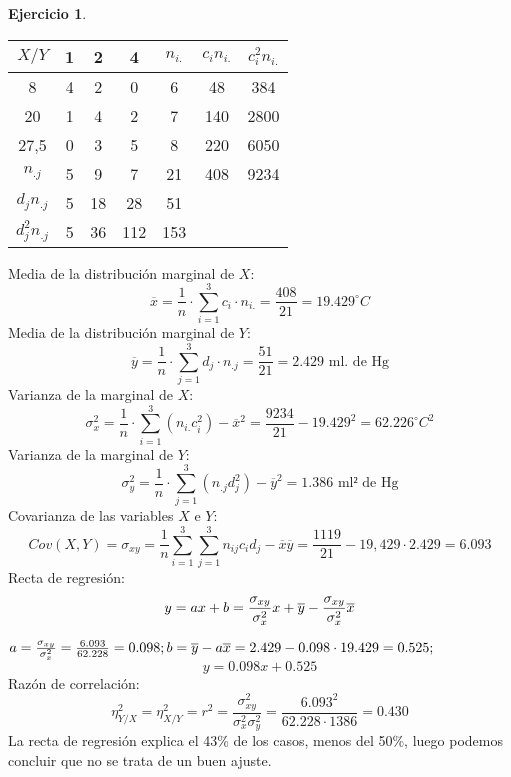 \documentclass[a4paper, 12pt]{article}
\theoremstyle{definition}
\newtheorem{ej}{Ejercicio}
\begin{document}
\begin{ej}
\begin{center}
\begin{tabular}{c|ccc|ccc}
    $X/Y$ & 1 & 2 & 4 & $n_{i.}$ & $c_i n_{i.}$ & $c_i^2 n_{i.}$ \\
    \hline
    8 & 4 & 2 & 0 & 6 & 48 & 384 \\
    20 & 1 & 4 & 2 & 7 & 140 & 2800 \\
    27,5 & 0 & 3 & 5 & 8 & 220 & 6050 \\
    \hline
    $n_{.j}$ & 5 & 9 & 7 & 21 & 408 & 9234 \\
    $d_{j}n_{.j}$ & 5 & 18 & 28 & 51 \\
    $d_{j}^2 n_{.j}$ & 5 & 36 & 112 & 153 \\
\end{tabular}
\end{center} 

Media de la distribución marginal de $X$:
\[
\overline{x} = \frac{1}{n}\cdot \sum_{i=1}^3 c_i\cdot n_{i.} = \frac{408}{21} = 19.429^{\circ}C
\]
Media de la distribución marginal de $Y$:
\[
\overline{y} = \frac{1}{n}\cdot \sum_{j=1}^3 d_j\cdot n_{.j} = \frac{51}{21} = 2.429\text{ ml. de Hg}
\]
Varianza de la marginal de $X$:
\[
\sigma_x^2 = \frac{1}{n}\cdot \sum_{i=1}^3 (n_{i.}  c_i^2) -\overline{x}^2 = \frac{9234}{21} - 19.429^2 = 62.226^{\circ} C^2
\]
Varianza de la marginal de $Y$:
\[
\sigma_y^2 = \frac{1}{n}\cdot \sum_{j=1}^3 (n_{.j}  d_j^2) -\overline{y}^2 = 1.386 \text{ ml² de Hg}
\]
Covarianza de las variables $X$ e $Y$:
\[
Cov(X,Y) = \sigma_{xy} = \frac{1}{n} \sum_{i=1}^3\sum_{j=1}^3 n_{ij} c_{i} d_{j} - \overline{x} \overline{y} = \frac{1119}{21} - 19,429\cdot 2.429 = 6.093
\]
Recta de regresión:
\[
y = ax + b = \frac{\sigma_{xy}}{\sigma_x^2}x + \overline{y} - \frac{\sigma_{xy}}{\sigma_x^2}\overline{x} \\
\]

\(
a= \frac{\sigma_{xy}}{\sigma_x^2} = \frac{6.093}{62.228}= 0.098 ; \\
b= \overline{y} - a\overline{x} = 2.429 - 0.098\cdot 19.429 = 0.525;
\)
\[
y=0.098x + 0.525
\]
Razón de correlación:
\[
\eta_{Y/X}^{2} = \eta_{X/Y}^{2} = r^2 = \frac{\sigma_{xy}^2}{\sigma_x^2 \sigma_y^2} = \frac{6.093^2}{62.228\cdot 1386} = 0.430
\]
La recta de regresión explica el 43\% de los casos, menos del 50\%, luego podemos concluir que no se trata de un buen ajuste. \\


\end{ej}
\end{document}
